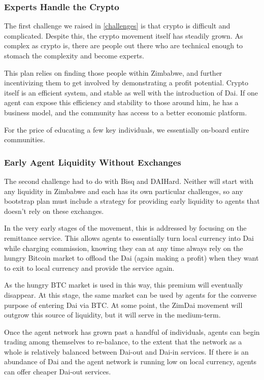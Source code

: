 \documentclass{article}
\begin{document}
\subsubsection{Experts Handle the Crypto} \label{experts}

The first challenge we raised in \ref{challenges} is that crypto is difficult and complicated. Despite this, the crypto movement itself has steadily grown. As complex as crypto is, there are people out there who are technical enough to stomach the complexity and become experts.

This plan relies on finding those people within Zimbabwe, and further incentivizing them to get involved by demonstrating a profit potential. Crypto itself is an efficient system, and stable as well with the introduction of Dai. If one agent can expose this efficiency and stability to those around him, he has a business model, and the community has access to a better economic platform.

For the price of educating a few key individuals, we essentially on-board entire communities.

\subsubsection{Early Agent Liquidity Without Exchanges} \label{early liquidity}

The second challenge had to do with Bisq and DAIHard. Neither will start with any liquidity in Zimbabwe and each has its own particular challenges, so any bootstrap plan must include a strategy for providing early liquidity to agents that doesn't rely on these exchanges.

In the very early stages of the movement, this is addressed by focusing on the remittance service. This allows agents to essentially turn local currency into Dai while charging commission, knowing they can at any time always rely on the hungry Bitcoin market to offload the Dai (again making a profit) when they want to exit to local currency and provide the service again.

As the hungry BTC market is used in this way, this premium will eventually disappear. At this stage, the same market can be used by agents for the converse purpose of entering Dai via BTC. At some point, the ZimDai movement will outgrow this source of liquidity, but it will serve in the medium-term.

Once the agent network has grown past a handful of individuals, agents can begin trading among themselves to re-balance, to the extent that the network as a whole is relatively balanced between Dai-out and Dai-in services. If there is an abundance of Dai and the agent network is running low on local currency, agents can offer cheaper Dai-out services.
\end{document}
